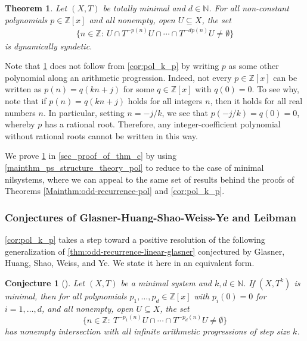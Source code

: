 \documentclass{article}
\theoremstyle{plain}
\newtheorem{Conjecture}[Theorem]{Conjecture}
\theoremstyle{claim}
\theoremstyle{definition}
\theoremstyle{plain}
\newcounter{MainTheoremCounter}
\newtheorem{Maintheorem}[MainTheoremCounter]{Theorem}
\theoremstyle{plain}
\newcommand{\N}{\mathbb{N}}
\newcommand{\Z}{\mathbb{Z}}
\newcommand{\1}{\boldsymbol{1}}
\begin{document}
\begin{Maintheorem}
\label{cor:totally_minimal}
    Let $(X,T)$ be totally minimal and $d \in \N$. For all non-constant  polynomials $p \in \Z[x]$ and all nonempty, open $U\subseteq X$, the set
    \begin{align}
    \label{eq_totallyminimalpolynomialrecurrence}
       \{n \in \Z: \ U\cap T^{-p(n)}U\cap\cdots\cap T^{-dp(n)}U\neq\emptyset\}
    \end{align}
    is dynamically syndetic. 
\end{Maintheorem}

Note that \cref{cor:totally_minimal} does not follow from \cref{cor:pol_k_p} by writing $p$ as some other polynomial along an arithmetic progression.  Indeed, not every $p \in \Z[x]$ can be written as $p(n) = q(kn + j)$ for some $q \in \Z[x]$ with $q(0) = 0$.  To see why, note that if $p(n) = q(kn + j)$ holds for all integers $n$, then it holds for all real numbers $n$.  In particular, setting $n = -j/k$, we see that $p(-j/k) = q(0) = 0$, whereby $p$ has a rational root.  Therefore, any integer-coefficient polynomial without rational roots cannot be written in this way.

We prove \cref{cor:totally_minimal} in \cref{sec_proof_of_thm_c} by using \cref{mainthm_ps_structure_theory_pol} to reduce to the case of minimal nilsystems, where we can appeal to the same set of results behind the proofs of Theorems \ref{Mainthm:odd-recurrence-pol} and \ref{cor:pol_k_p}.

\subsubsection{Conjectures of Glasner-Huang-Shao-Weiss-Ye and Leibman}

\cref{cor:pol_k_p} takes a step toward a positive resolution of the following generalization of \cref{thm:odd-recurrence-linear-glasner} conjectured by Glasner, Huang, Shao, Weiss, and Ye. We state it here in an equivalent form.

\begin{Conjecture}
[{\cite[Conjecture 3]{glasner_huang_shao_weiss_ye_2020}}]

\label{conj:polynomial-odd-recurrence_intro}
\label{conj:polynomial-odd-recurrence}
    Let $(X,T)$ be a minimal system and $k, d \in \N$. If $(X,T^k)$ is minimal, then for all polynomials $p_1,\dots,p_d \in \Z[x]$ with $p_i(0)=0$ for $i = 1, \ldots, d$, and all nonempty, open $U \subseteq X$, the set
    \[\big\{ n \in \Z : \ T^{-p_1(n)}U\cap\cdots\cap T^{-p_d(n)}U \neq \emptyset \big\}\]
    has nonempty intersection with all infinite arithmetic progressions of step size $k$.
\end{Conjecture}
\end{document}

